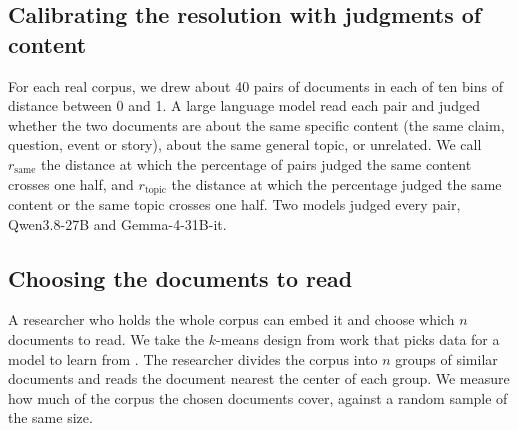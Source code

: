 \subsection{Calibrating the resolution with judgments of content}
\label{sec:rcalm}

For each real corpus, we drew about 40 pairs of documents in each of ten bins of distance between 0 and 1. A large language model read each pair and judged whether the two documents are about the same specific content (the same claim, question, event or story), about the same general topic, or unrelated. We call $r_{\mathrm{same}}$ the distance at which the percentage of pairs judged the same content crosses one half, and $r_{\mathrm{topic}}$ the distance at which the percentage judged the same content or the same topic crosses one half. Two models judged every pair, Qwen3.8-27B and Gemma-4-31B-it.

\subsection{Choosing the documents to read}
\label{sec:design}

A researcher who holds the whole corpus can embed it and choose which $n$ documents to read. We take the $k$-means design from work that picks data for a model to learn from \citep{chang2021training,yuan2020coldstart,hacohen2022active,zhang2023autocot}. The researcher divides the corpus into $n$ groups of similar documents \citep{lloyd1982} and reads the document nearest the center of each group. We measure how much of the corpus the chosen documents cover, against a random sample of the same size.
